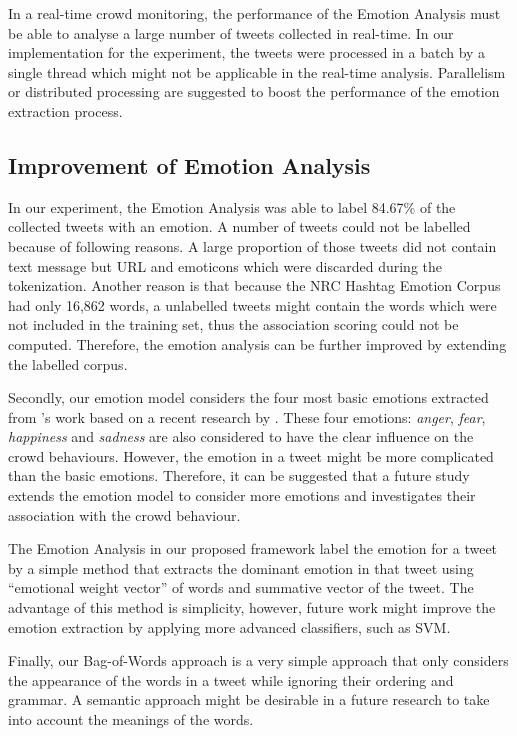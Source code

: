 In a real-time crowd monitoring, the performance of the Emotion Analysis must be able to analyse a large number of tweets collected in real-time. In our implementation for the experiment, the tweets were processed in a batch by a single thread which might not be applicable in the real-time analysis. Parallelism or distributed processing are suggested to boost the performance of the emotion extraction process.

\subsection{Improvement of Emotion Analysis}
In our experiment, the Emotion Analysis was able to label 84.67\% of the collected tweets with an emotion. A number of tweets could not be labelled because of following reasons. A large proportion of those tweets did not contain text message but URL and emoticons which were discarded during the tokenization. Another reason is that because the NRC Hashtag Emotion Corpus had only 16,862 words, a unlabelled tweets might contain the words which were not included in the training set, thus the association scoring could not be computed. Therefore, the emotion analysis can be further improved by extending the labelled corpus.

Secondly, our emotion model considers the four most basic emotions extracted from \citet{ekman1971constants}'s work based on a recent research by \citet{Jack2014}. These four emotions: \textit{anger}, \textit{fear}, \textit{happiness} and \textit{sadness} are also considered to have the clear influence on the crowd behaviours. However, the emotion in a tweet might be more complicated than the basic emotions. Therefore, it can be suggested that a future study extends the emotion model to consider more emotions and investigates their association with the crowd behaviour.

The Emotion Analysis in our proposed framework label the emotion for a tweet by a simple method that extracts the dominant emotion in that tweet using ``emotional weight vector'' of words and summative vector of the tweet. The advantage of this method is simplicity, however, future work might improve the emotion extraction by applying more advanced classifiers, such as SVM.

Finally, our Bag-of-Words approach is a very simple approach that only considers the appearance of the words in a tweet while ignoring their ordering and grammar. A semantic approach might be desirable in a future research to take into account the meanings of the words.

